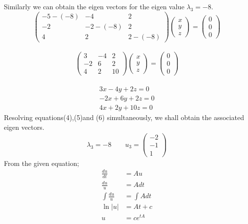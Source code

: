 \documentclass[12pt,a4paper]{article}
\begin{document}
\begin{itemize}
\begin{itemize}
Similarly we can obtain the eigen vectors for the eigen value $\lambda_{3}=-8$.\\
\[
\begin{pmatrix} -5-\left(-8\right) & -4 & 2 \\ -2 & -2-\left(-8\right) & 2\\4 &2 &2-\left(-8\right) \end{pmatrix} \begin{pmatrix} x \\ y \\z \end{pmatrix}=\begin{pmatrix} 0 \\ 0 \\0 \end{pmatrix}\]\\
\[
\begin{pmatrix} 3 & -4 & 2 \\ -2 & 6 & 2\\4 &2 &10 \end{pmatrix} \begin{pmatrix} x \\ y \\z \end{pmatrix}=\begin{pmatrix} 0 \\ 0 \\0 \end{pmatrix}
\]\\
\begin{align}
3x-4y+2z=0\\
-2x+6y+2z=0\\
4x+2y+10z=0
\end{align}
Resolving equations(4),(5)and (6) simultaneously, we shall obtain the associated eigen vectors.\\
\begin{align*}
\lambda_{3}=-8\quad \quad u_{3}=
\begin{pmatrix} -2 \\ -1 \\1 \end{pmatrix}
\end{align*}
From the given equation;\\
\begin{align*}
\frac{du}{dt}&=Au\\
\frac{du}{u}&=Adt\\
\int \frac{du}{u}&=\int Adt\\
\ln |u|&=At+c\\
u&=ce^{tA}

\end{align*}
\end{itemize}
\end{itemize}
\end{document}
